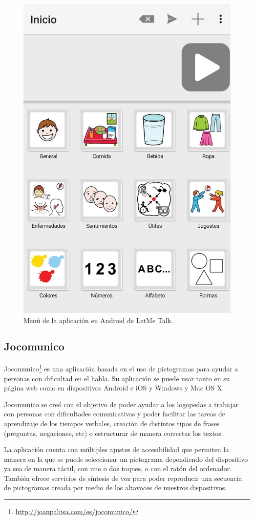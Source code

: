 \begin{figure}[h!]
	\centering
	\includegraphics[width=0.7\linewidth]{Imagenes/Bitmap/LetMeTalk}
	\caption{Menú de la aplicación en Android de LetMe Talk.}
	\label{fig:letmetalk}
\end{figure}

\newpage

\subsection{Jocomunico}
\label{cap2:jocomunico}
Jocomunico\footnote{\url{http://joanpahisa.com/es/jocomunico/}} es una aplicación basada en el uso de pictogramas para ayudar a personas con dificultad en el habla. Su aplicación se puede usar tanto en su página web como en dispositivos Android e iOS y Windows y Mac OS X.

Jocomunico se creó con el objetivo de poder ayudar a los logopedas a trabajar con personas con dificultades comunicativas y poder facilitar las tareas de aprendizaje de los tiempos verbales, creación de distintos tipos de frases (preguntas, negaciones, etc) o estructurar de manera correctas los textos.

La aplicación cuenta con múltiples ajustes de accesibilidad que permiten la manera en la que se puede seleccionar un pictograma dependiendo del dispositivo ya sea de manera táctil, con uno o dos toques, o con el ratón del ordenador. También ofrece servicios de síntesis de voz para poder reproducir una secuencia de pictogramas creada por medio de los altavoces de nuestros dispositivos.

